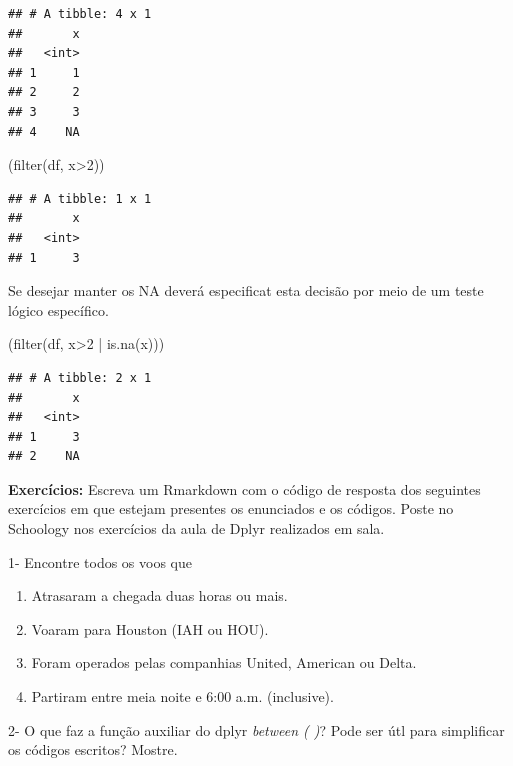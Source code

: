 \documentclass[
]{article}
\newenvironment{Shaded}{\begin{snugshade}}{\end{snugshade}}
\newcommand{\DecValTok}[1]{\textcolor[rgb]{0.00,0.00,0.81}{#1}}
\newcommand{\FunctionTok}[1]{\textcolor[rgb]{0.00,0.00,0.00}{#1}}
\newcommand{\NormalTok}[1]{#1}
\newcommand{\SpecialCharTok}[1]{\textcolor[rgb]{0.00,0.00,0.00}{#1}}
\begin{document}
\begin{verbatim}
## # A tibble: 4 x 1
##       x
##   <int>
## 1     1
## 2     2
## 3     3
## 4    NA
\end{verbatim}

\begin{Shaded}
\begin{Highlighting}[]
\NormalTok{(}\FunctionTok{filter}\NormalTok{(df, x}\SpecialCharTok{\textgreater{}}\DecValTok{2}\NormalTok{))}
\end{Highlighting}
\end{Shaded}

\begin{verbatim}
## # A tibble: 1 x 1
##       x
##   <int>
## 1     3
\end{verbatim}

Se desejar manter os NA deverá especificat esta decisão por meio de um
teste lógico específico.

\begin{Shaded}
\begin{Highlighting}[]
\NormalTok{(}\FunctionTok{filter}\NormalTok{(df, x}\SpecialCharTok{\textgreater{}}\DecValTok{2} \SpecialCharTok{|} \FunctionTok{is.na}\NormalTok{(x)))}
\end{Highlighting}
\end{Shaded}

\begin{verbatim}
## # A tibble: 2 x 1
##       x
##   <int>
## 1     3
## 2    NA
\end{verbatim}

\textbf{Exercícios:} Escreva um Rmarkdown com o código de resposta dos
seguintes exercícios em que estejam presentes os enunciados e os
códigos. Poste no Schoology nos exercícios da aula de Dplyr realizados
em sala.

1- Encontre todos os voos que

\begin{enumerate}
\def\labelenumi{\alph{enumi}.}
\item
  Atrasaram a chegada duas horas ou mais.
\item
  Voaram para Houston (IAH ou HOU).
\item
  Foram operados pelas companhias United, American ou Delta.
\item
  Partiram entre meia noite e 6:00 a.m. (inclusive).
\end{enumerate}

2- O que faz a função auxiliar do dplyr \emph{between ( )}? Pode ser útl
para simplificar os códigos escritos? Mostre.
\end{document}

